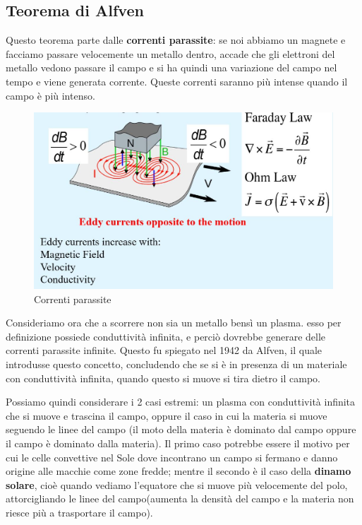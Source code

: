 \documentclass[a4paper,11pt]{article}
\begin{document}
\subsection{Teorema di Alfven}
Questo teorema parte dalle \textbf{correnti parassite}: se noi abbiamo un magnete e facciamo passare velocemente un metallo dentro, accade che gli elettroni del metallo vedono passare il campo e si ha quindi una variazione del campo nel tempo e viene generata corrente. Queste correnti saranno più intense quando il campo è più intenso. 
\begin{figure}[h!!]
        \centering
        \includegraphics[width=14cm]{Correnti parassite.JPG}
        \caption{Correnti parassite}
        \label{fig:Correnti parassite}
    \end{figure}
Consideriamo ora che a scorrere non sia un metallo bensì un plasma. esso per definizione possiede conduttività infinita, e perciò dovrebbe generare delle correnti parassite infinite. Questo fu spiegato nel 1942 da Alfven, il quale introdusse questo concetto, concludendo che se si è in presenza di un materiale con conduttività infinita, quando questo si muove si tira dietro il campo.

Possiamo quindi considerare i 2 casi estremi: un plasma con conduttività infinita che si muove e trascina il campo, oppure il caso in cui la materia si muove seguendo le linee del campo (il moto della materia è dominato dal campo oppure il campo è dominato dalla materia). Il primo caso potrebbe essere il motivo per cui le celle convettive nel Sole dove incontrano un campo si fermano e danno origine alle macchie come zone fredde; mentre il secondo è il caso della \textbf{dinamo solare}, cioè quando vediamo l'equatore che si muove più velocemente del polo, attorcigliando le linee del campo(aumenta la densità del campo e la materia non riesce più a trasportare il campo). 
\end{document}
